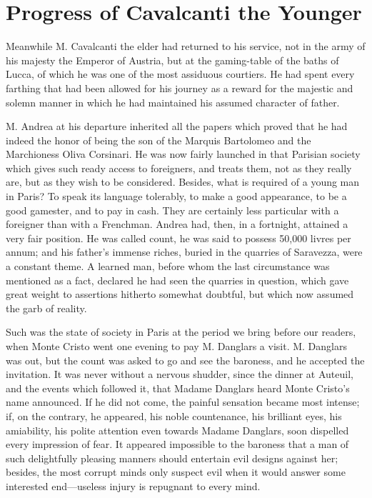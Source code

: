 \chapter{Progress of Cavalcanti the Younger}

Meanwhile M. Cavalcanti the elder had returned to his service, not in
the army of his majesty the Emperor of Austria, but at the gaming-table
of the baths of Lucca, of which he was one of the most assiduous
courtiers. He had spent every farthing that had been allowed for his
journey as a reward for the majestic and solemn manner in which he had
maintained his assumed character of father.

M. Andrea at his departure inherited all the papers which proved that
he had indeed the honor of being the son of the Marquis Bartolomeo and
the Marchioness Oliva Corsinari. He was now fairly launched in that
Parisian society which gives such ready access to foreigners, and
treats them, not as they really are, but as they wish to be considered.
Besides, what is required of a young man in Paris? To speak its
language tolerably, to make a good appearance, to be a good gamester,
and to pay in cash. They are certainly less particular with a foreigner
than with a Frenchman. Andrea had, then, in a fortnight, attained a
very fair position. He was called count, he was said to possess 50,000
livres per annum; and his father’s immense riches, buried in the
quarries of Saravezza, were a constant theme. A learned man, before
whom the last circumstance was mentioned as a fact, declared he had
seen the quarries in question, which gave great weight to assertions
hitherto somewhat doubtful, but which now assumed the garb of reality.

Such was the state of society in Paris at the period we bring before
our readers, when Monte Cristo went one evening to pay M. Danglars a
visit. M. Danglars was out, but the count was asked to go and see the
baroness, and he accepted the invitation. It was never without a
nervous shudder, since the dinner at Auteuil, and the events which
followed it, that Madame Danglars heard Monte Cristo’s name announced.
If he did not come, the painful sensation became most intense; if, on
the contrary, he appeared, his noble countenance, his brilliant eyes,
his amiability, his polite attention even towards Madame Danglars, soon
dispelled every impression of fear. It appeared impossible to the
baroness that a man of such delightfully pleasing manners should
entertain evil designs against her; besides, the most corrupt minds
only suspect evil when it would answer some interested end—useless
injury is repugnant to every mind.

